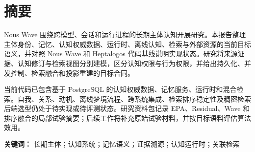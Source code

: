 \chapter*{摘要}

Nous Wave 围绕跨模型、会话和运行进程的长期主体认知开展研究。本报告整理主体身份、记忆、认知权威数据、运行时、离线认知、检索与外部资源的当前目标语义，并对照 Nous Wave 和 Heptalogos 代码基线说明实现状态。研究将来源证据、认知修订与检索视图分别建模，区分认知权限与行为权限，并给出持久化、并发控制、检索融合和投影重建的目标合同。

当前代码已包含基于 PostgreSQL 的认知权威数据、记忆服务、运行时和混合检索。自我、关系、动机、离线梦境流程、跨系统集成、检索排序稳定性及稠密检索后端选型仍处于待实现或待评测状态。研究资料包记录 EPA、Residual、Wave 和排序融合的局部试验摘要；后续工作将补充原始试验材料，并按目标语料评估算法效用。

\textbf{关键词：} 长期主体；认知系统；记忆语义；证据溯源；认知运行时；关联检索
\clearpage
